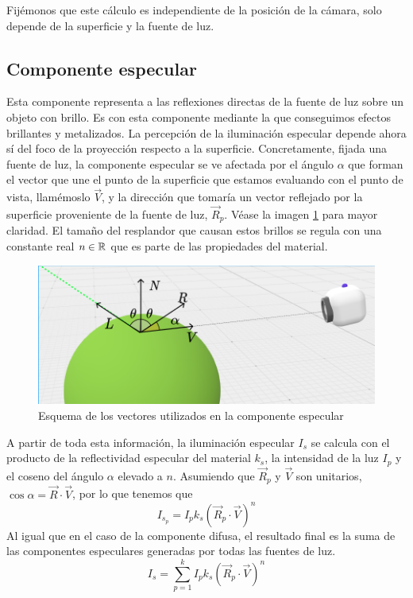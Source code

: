 Fijémonos que este cálculo es independiente de la posición de la cámara, solo depende de la superficie y la fuente de luz.

\subsection{Componente especular}

Esta componente representa a las reflexiones directas de la fuente de luz sobre un objeto con brillo. Es con esta componente mediante la que conseguimos efectos brillantes y metalizados. La percepción de la iluminación especular depende ahora sí del foco de la proyección respecto a la superficie. Concretamente, fijada una fuente de luz, la componente especular se ve afectada por el ángulo $\alpha$ que forman el vector que une el punto de la superficie que estamos evaluando con el punto de vista, llamémoslo  $\vec V$, y la dirección que tomaría un vector reflejado por la superficie proveniente de la fuente de luz, $\vec R_p$. Véase la imagen \ref{fig:especular} para mayor claridad. El tamaño del resplandor que causan estos brillos se regula con una constante real $n\in\mathbb{R}$ que es parte de las propiedades del material.

\begin{figure} [ht]
    \centering
    \includegraphics[scale = 0.3]{img/C7/especular.png}
    \caption{Esquema de los vectores utilizados en la componente especular}
    \label{fig:especular}
\end{figure}

A partir de toda esta información, la iluminación especular $I_s$ se calcula con el producto de la reflectividad especular del material $k_s$, la intensidad de la luz $I_p$ y el coseno del ángulo $\alpha$ elevado a $n$. Asumiendo que $\vec R_p$ y $\vec V$ son unitarios, $\cos\alpha=\vec R\cdot \vec V$, por lo que tenemos que
\begin{equation}
    I_{s_p} = I_p k_s (\vec R_p\cdot \vec V)^n
\end{equation}   
Al igual que en el caso de la componente difusa, el resultado final es la suma de las componentes especulares generadas por todas las fuentes de luz.
\begin{equation}
    I_s = \sum_{p=1}^k I_p k_s (\vec R_p \cdot \vec V)^n
\end{equation}

